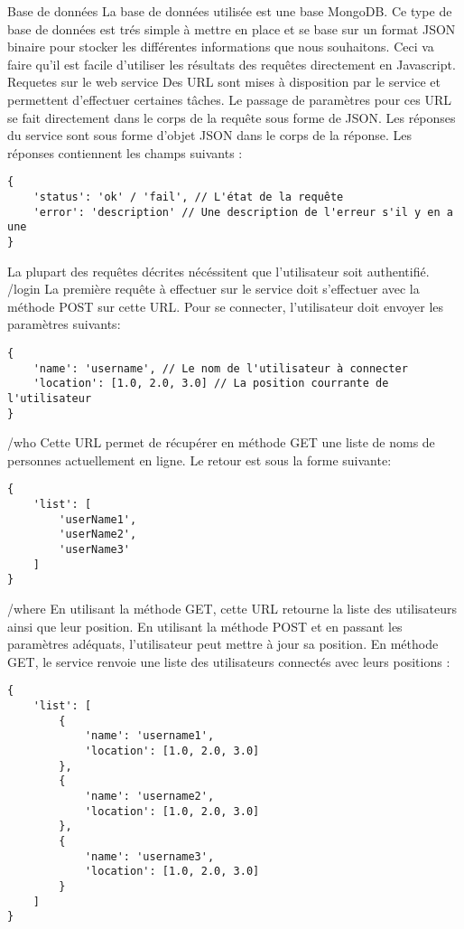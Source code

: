 Base de données
La base de données utilisée est une base MongoDB. Ce type de base de données est trés simple à mettre en place et se base sur un format JSON binaire pour stocker les différentes informations que nous souhaitons. Ceci va faire qu'il est facile d'utiliser les résultats des requêtes directement en Javascript.
Requetes sur le web service
Des URL sont mises à disposition par le service et permettent d'effectuer certaines tâches. Le passage de paramètres pour ces URL se fait directement dans le corps de la requête sous forme de JSON.
Les réponses du service sont sous forme d'objet JSON dans le corps de la réponse. Les réponses contiennent les champs suivants :

\lstset{language=Javascript}
\begin{lstlisting}[caption=Corps de la réponse serveur]
{
    'status': 'ok' / 'fail', // L'état de la requête
    'error': 'description' // Une description de l'erreur s'il y en a une
}
\end{lstlisting}


La plupart des requêtes décrites nécéssitent que l'utilisateur soit authentifié.
/login
La première requête à effectuer sur le service doit s'effectuer avec la méthode POST sur cette URL. Pour se connecter, l'utilisateur doit envoyer les paramètres suivants: 
\lstset{language=Javascript}
\begin{lstlisting}[caption=Corps de la requête login]
{
    'name': 'username', // Le nom de l'utilisateur à connecter
    'location': [1.0, 2.0, 3.0] // La position courrante de l'utilisateur
}
\end{lstlisting}

/who
Cette URL permet de récupérer en méthode GET une liste de noms de personnes actuellement en ligne. Le retour est sous la forme suivante:
\lstset{language=Javascript}
\begin{lstlisting}[caption=Corps de la requête who]
{
    'list': [
        'userName1',
        'userName2',
        'userName3'
    ]
}
\end{lstlisting}

/where
En utilisant la méthode GET, cette URL retourne la liste des utilisateurs ainsi que leur position. En utilisant la méthode POST et en passant les paramètres adéquats, l'utilisateur peut mettre à jour sa position.
En méthode GET, le service renvoie une liste des utilisateurs connectés avec leurs positions :
\lstset{language=Javascript}
\begin{lstlisting}[caption=Corps de la requête where GET]
{
    'list': [
        {
            'name': 'username1',
            'location': [1.0, 2.0, 3.0]
        },
        {
            'name': 'username2',
            'location': [1.0, 2.0, 3.0]
        },
        {
            'name': 'username3',
            'location': [1.0, 2.0, 3.0]
        }
    ]
}
\end{lstlisting}

